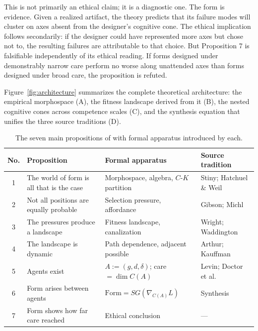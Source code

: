 This is not primarily an ethical claim; it is a diagnostic one. The form is evidence. Given a realized artifact, the theory predicts that its failure modes will cluster on axes absent from the designer's cognitive cone. The ethical implication follows secondarily: if the designer could have represented more axes but chose not to, the resulting failures are attributable to that choice. But Proposition 7 is falsifiable independently of its ethical reading. If forms designed under demonstrably narrow care perform no worse along unattended axes than forms designed under broad care, the proposition is refuted.

Figure~\ref{fig:architecture} summarizes the complete theoretical architecture: the empirical morphospace (A), the fitness landscape derived from it (B), the nested cognitive cones across competence scales (C), and the synthesis equation that unifies the three source traditions (D).



\begin{table}[!t]
\centering
\caption{The seven main propositions of \formlaere{} with formal apparatus introduced by each.}
\label{tab:propositions}
\small
\begin{tabularx}{\textwidth}{@{}c >{\raggedright}p{} >{\raggedright}p{} >{\raggedright\arraybackslash}p{}@{}}
\toprule
\textbf{No.} & \textbf{Proposition} & \textbf{Formal apparatus} & \textbf{Source tradition} \\
\midrule
1 & The world of form is all that is the case & Morphospace, algebra, $C$-$K$ partition & Stiny; Hatchuel \& Weil \\[3pt]
2 & Not all positions are equally probable & Selection pressure, affordance & Gibson; Michl \\[3pt]
3 & The pressures produce a landscape & Fitness landscape, canalization & Wright; Waddington \\[3pt]
4 & The landscape is dynamic & Path dependence, adjacent possible & Arthur; Kauffman \\[3pt]
5 & Agents exist & $A := (g,d,\delta)$;\; care $= \dim C(A)$ & Levin; Doctor et al. \\[3pt]
6 & Form arises between agents & $\mathrm{Form} = SG(\nabla_{C(A)} L)$ & Synthesis \\[3pt]
7 & Form shows how far care reached & Ethical conclusion & --- \\
\bottomrule
\end{tabularx}
\end{table}

